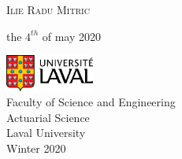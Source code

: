 \begin{titlepage}
		{\scshape\Large Ilie Radu Mitric \\} %
		
		\vspace*{3\baselineskip}
		
		the $4^{th}$ of may 2020
		
		\vspace{0.5\baselineskip} %
		
		\vfill %
		
		
		\includegraphics[height=1.2cm]{UL_P.pdf}\\
		
		Faculty of Science and Engineering\\
		Actuarial Science\\
		Laval University\\
		Winter 2020       
	\end{titlepage}